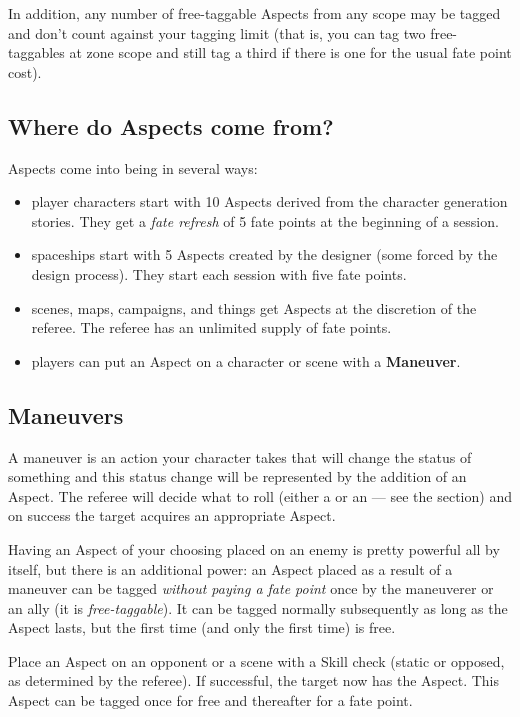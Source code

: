 In addition, any number of free-taggable Aspects from any scope may be tagged and don't count against your tagging limit (that is, you can tag two free-taggables at zone scope and still tag a third if there is one for the usual fate point cost).

\subsection{Where do Aspects come from?}

Aspects come into being in several ways:
\begin{itemize}
\item player characters start with 10 Aspects derived from the character generation stories. They get a \emph{fate refresh} of 5 fate points at the beginning of a session.

\item spaceships start with 5 Aspects created by the designer (some forced by the design process). They start each session with five fate points.

\item scenes, maps, campaigns, and things get Aspects at the discretion of the referee. The referee has an unlimited supply of fate points.

\item players can put an Aspect on a character or scene with a \textbf{Maneuver}.
\end{itemize}

\subsection{Maneuvers}\label{sec:maneuvers} %

A maneuver is an action your character takes that will change the status of something and this status change will be represented by the addition of an Aspect. The referee will decide what to roll (either a  or an  --- see the  section) and on success the target acquires an appropriate Aspect.

Having an Aspect of your choosing placed on an enemy is pretty powerful all by itself, but there is an additional power: an Aspect placed as a result of a maneuver can be tagged \emph{without paying a fate point} once by the maneuverer or an ally (it is \emph{free-taggable}). It can be tagged normally subsequently as long as the Aspect lasts, but the first time (and only the first time) is free.

Place an Aspect on an opponent or a scene with a Skill check (static or opposed, as determined by the referee). If successful, the target now has the Aspect. This Aspect can be tagged once for free and thereafter for a fate point.

